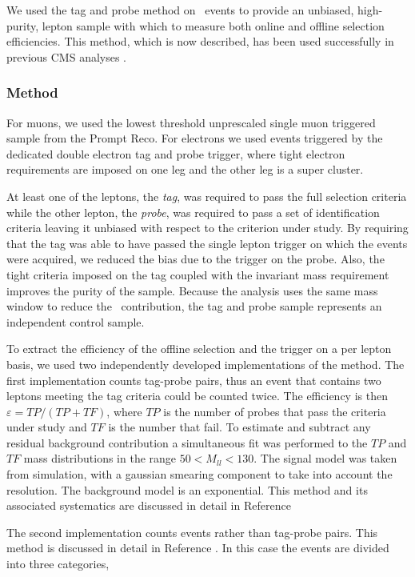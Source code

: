  
We used the tag and probe method on \dyll~events to provide an unbiased, high-purity, 
lepton sample with which to measure both online and offline selection efficiencies.
This method, which is now described, 
has been used successfully in previous CMS analyses \cite{ref:tagprobe_mit_w}\cite{ref:tagprobe_snt_top}.

\subsubsection{Method}
For muons, we used the lowest threshold unprescaled single muon triggered sample from the Prompt Reco.
For electrons we used events triggered by the dedicated double electron tag and probe trigger,
where tight electron requirements are imposed on one leg and the other leg is a super cluster.

At least one of the leptons, the {\it tag}, was required to pass the full selection criteria
while the other lepton, the {\it probe}, was required to pass a set of identification criteria leaving 
it unbiased with respect to the criterion under study. By requiring that the tag was able to have passed 
the single lepton trigger on which the events were acquired, we reduced the bias due to the trigger on 
the probe. Also, the tight criteria imposed on the tag coupled with the invariant mass requirement 
improves the purity of the sample. Because the analysis uses the same mass window to reduce the 
\dyll~contribution, the tag and probe sample represents an independent control sample.

To extract the efficiency of the offline selection and the trigger on a per lepton basis, 
we used two independently developed implementations of the method.
The first implementation counts tag-probe pairs, thus 
an event that contains two leptons meeting the tag criteria could be counted twice.
The efficiency is then $\varepsilon=TP/(TP+TF)$, 
where $TP$ is the number of probes that pass the criteria under study and $TF$ is the number that fail.
To estimate and subtract any residual background contribution a simultaneous fit was performed to the $TP$ and $TF$ 
mass distributions in the range $50<M_{ll}<130$.
The signal model was taken from simulation, with a gaussian smearing component to take into 
account the resolution.
The background model is an exponential.
This method and its associated systematics are discussed in detail in Reference \cite{ref:tagprobe_mit_w}

The second implementation counts events rather than tag-probe pairs.
This method is discussed in detail in Reference \cite{ref:tagprobe_snt_top}.
In this case the events are divided into three categories,

